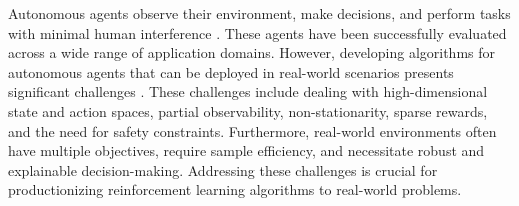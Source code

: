 

Autonomous agents observe their environment, make decisions, and perform tasks with minimal human interference \citep{sutton2018reinforcement}.
These agents have been successfully evaluated across a wide range of application domains. However, developing algorithms for autonomous agents that can be deployed in real-world scenarios presents significant challenges \citep{dulac2021challenges}. These challenges include dealing with high-dimensional state and action spaces, partial observability, non-stationarity, sparse rewards, and the need for safety constraints. Furthermore, real-world environments often have multiple objectives, require sample efficiency, and necessitate robust and explainable decision-making. Addressing these challenges is crucial for productionizing reinforcement learning algorithms to real-world problems. 


